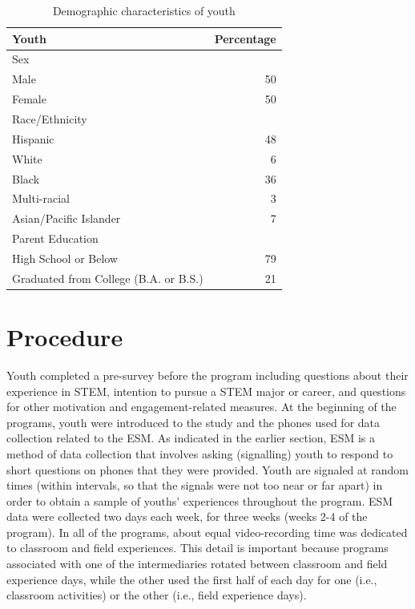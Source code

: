 \documentclass[]{book}
\theoremstyle{definition}
\theoremstyle{definition}
\theoremstyle{definition}
\theoremstyle{remark}
\begin{document}
\begin{table}

\caption{\label{tab:unnamed-chunk-3}Demographic characteristics of youth}
\centering
\begin{tabular}[t]{lr}
\toprule
Youth & Percentage\\
\midrule
Sex & \\
Male & 50\\
Female & 50\\
Race/Ethnicity & \\
Hispanic & 48\\
\addlinespace
White & 6\\
Black & 36\\
Multi-racial & 3\\
Asian/Pacific Islander & 7\\
Parent Education & \\
\addlinespace
High School or Below & 79\\
Graduated from College (B.A. or B.S.) & 21\\
\bottomrule
\end{tabular}
\end{table}

\section{Procedure}\label{procedure}

Youth completed a pre-survey before the program including questions
about their experience in STEM, intention to pursue a STEM major or
career, and questions for other motivation and engagement-related
measures. At the beginning of the programs, youth were introduced to the
study and the phones used for data collection related to the ESM. As
indicated in the earlier section, ESM is a method of data collection
that involves asking (signalling) youth to respond to short questions on
phones that they were provided. Youth are signaled at random times
(within intervals, so that the signals were not too near or far apart)
in order to obtain a sample of youths' experiences throughout the
program. ESM data were collected two days each week, for three weeks
(weeks 2-4 of the program). In all of the programs, about equal
video-recording time was dedicated to classroom and field experiences.
This detail is important because programs associated with one of the
intermediaries rotated between classroom and field experience days,
while the other used the first half of each day for one (i.e., classroom
activities) or the other (i.e., field experience days).
\end{document}
